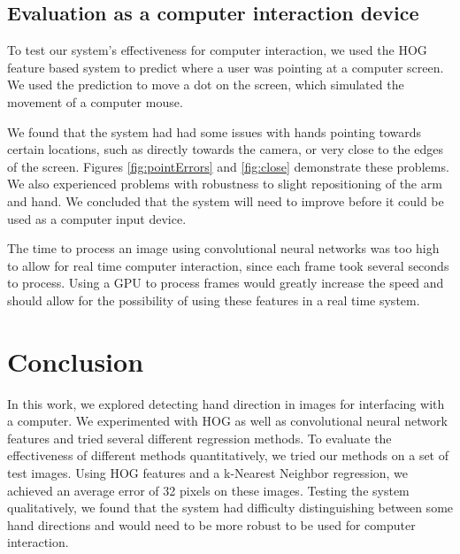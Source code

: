 \documentclass[10pt,twocolumn,letterpaper]{article}
\begin{document}
\subsection{Evaluation as a computer interaction device}
	
To test our system's effectiveness for computer interaction, we used the HOG feature based system to predict where a user was pointing at a computer screen.  We used the prediction to move a dot on the screen, which simulated the movement of a computer mouse.

We found that the system had had some issues with hands pointing towards certain locations, such as directly towards the camera, or very close to the edges of the screen.  Figures \ref{fig:pointErrors} and \ref{fig:close} demonstrate these problems.  We also experienced problems with robustness to slight repositioning of the arm and hand.  We concluded that the system will need to improve before it could be used as a computer input device.

The time to process an image using convolutional neural networks was too high to allow for real time computer interaction, since each frame took several seconds to process.  Using a GPU to process frames would greatly increase the speed and should allow for the possibility of using these features in a real time system.

\section{Conclusion}
In this work, we explored detecting hand direction in images for interfacing with a computer.  We experimented with HOG as well as convolutional neural network features and tried several different regression methods.  To evaluate the effectiveness of different methods quantitatively, we tried our methods on a set of test images.  Using HOG features and a k-Nearest Neighbor regression, we achieved an average error of 32 pixels on these images.  Testing the system qualitatively, we found that the system had difficulty distinguishing between some hand directions and would need to be more robust to be used for computer interaction.


{\small


}
\end{document}
